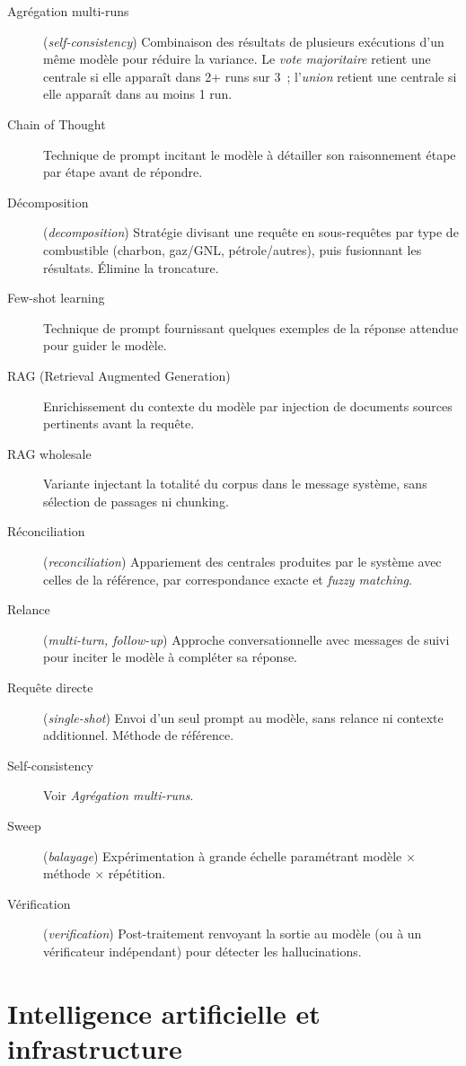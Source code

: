 \begin{description}
\item[Agrégation multi-runs] (\emph{self-consistency}) Combinaison des résultats de plusieurs exécutions d'un même modèle pour réduire la variance. Le \emph{vote majoritaire} retient une centrale si elle apparaît dans 2+ runs sur 3~; l'\emph{union} retient une centrale si elle apparaît dans au moins 1 run.
\item[Chain of Thought] Technique de prompt incitant le modèle à détailler son raisonnement étape par étape avant de répondre.
\item[Décomposition] (\emph{decomposition}) Stratégie divisant une requête en sous-requêtes par type de combustible (charbon, gaz/GNL, pétrole/autres), puis fusionnant les résultats. Élimine la troncature.
\item[Few-shot learning] Technique de prompt fournissant quelques exemples de la réponse attendue pour guider le modèle.
\item[RAG (Retrieval Augmented Generation)] Enrichissement du contexte du modèle par injection de documents sources pertinents avant la requête.
\item[RAG wholesale] Variante injectant la totalité du corpus dans le message système, sans sélection de passages ni chunking.
\item[Réconciliation] (\emph{reconciliation}) Appariement des centrales produites par le système avec celles de la référence, par correspondance exacte et \emph{fuzzy matching}.
\item[Relance] (\emph{multi-turn, follow-up}) Approche conversationnelle avec messages de suivi pour inciter le modèle à compléter sa réponse.
\item[Requête directe] (\emph{single-shot}) Envoi d'un seul prompt au modèle, sans relance ni contexte additionnel. Méthode de référence.
\item[Self-consistency] Voir \emph{Agrégation multi-runs}.
\item[Sweep] (\emph{balayage}) Expérimentation à grande échelle paramétrant modèle $\times$ méthode $\times$ répétition.
\item[Vérification] (\emph{verification}) Post-traitement renvoyant la sortie au modèle (ou à un vérificateur indépendant) pour détecter les hallucinations.
\end{description}

\section*{Intelligence artificielle et infrastructure}

